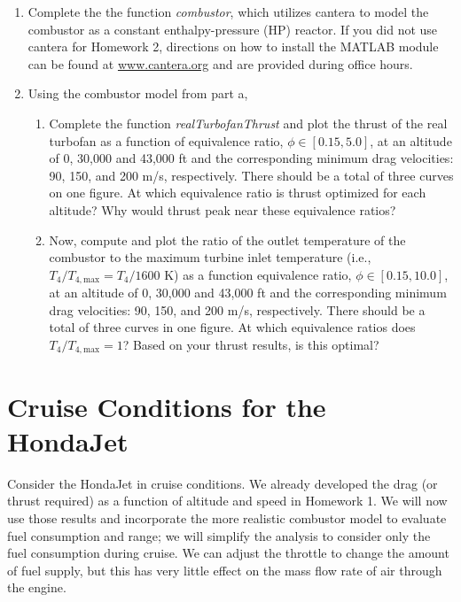 \documentclass[11pt]{article}
\begin{document}
\begin{enumerate}[label=(\alph*)]
	\item Complete the the function \emph{combustor}, which utilizes cantera to model the combustor as a constant enthalpy-pressure (HP) reactor. If you did not use cantera for Homework 2, directions on how to install the MATLAB module can be found at \href{http://www.cantera.org/docs/sphinx/html/install.html}{www.cantera.org} and are provided during office hours.
    
    \item Using the combustor model from part a, 
    \begin{enumerate}[label=(\roman*)]
    	\item
        	Complete the function \emph{realTurbofanThrust} and plot the thrust of the real turbofan as a function of equivalence ratio, $\phi\in[0.15,5.0]$, at an altitude of 0, 30,000 and 43,000 ft and the corresponding minimum drag velocities: 90, 150, and 200 m/s, respectively. There should be a total of three curves on one figure. At which equivalence ratio is thrust optimized for each altitude? Why would thrust peak near these equivalence ratios?
    	\item 
        	Now, compute and plot the ratio of the outlet temperature of the combustor to the maximum turbine inlet temperature (i.e., $T_4/T_{4,\mathrm{max}}=T_4/1600$ K) as a function equivalence ratio, $\phi\in[0.15,10.0]$, at an altitude of 0, 30,000 and 43,000 ft and the corresponding minimum drag velocities: 90, 150, and 200 m/s, respectively. There should be a total of three curves in one figure. At which equivalence ratios does $T_4/T_{4,\mathrm{max}}=1$? Based on your thrust results, is this optimal? 
    \end{enumerate}
\end{enumerate}
\section{Cruise Conditions for the HondaJet}
Consider the HondaJet in cruise conditions. We already developed the drag (or thrust required) as a function of altitude and speed in Homework 1. We will now use those results and incorporate the more realistic combustor model to evaluate fuel consumption and range; we will simplify the analysis to consider only the fuel consumption during cruise. We can adjust the throttle to change the amount of fuel supply, but this has very little effect on the mass flow rate of air through the engine.
\end{document}
